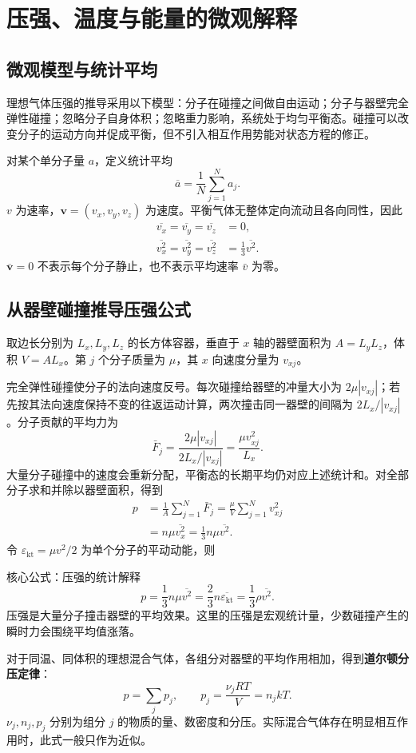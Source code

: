 \documentclass[UTF8,fontset=none,zihao=-4,a4paper]{ctexart}
\newcommand{\chapterpage}[1]{\clearpage\section{#1}}
\newcommand{\term}[1]{\textbf{#1}}
\begin{document}
\chapterpage{压强、温度与能量的微观解释}
\subsection{微观模型与统计平均}
理想气体压强的推导采用以下模型：分子在碰撞之间做自由运动；分子与器壁完全弹性碰撞；忽略分子自身体积；忽略重力影响，系统处于均匀平衡态。碰撞可以改变分子的运动方向并促成平衡，但不引入相互作用势能对状态方程的修正。

对某个单分子量 $a$，定义统计平均
\[
 \overline a=\frac1N\sum_{j=1}^{N}a_j.
\]
$v$ 为速率，$\symbf v=(v_x,v_y,v_z)$ 为速度。平衡气体无整体定向流动且各向同性，因此
\begin{align*}
 \overline{v_x}=\overline{v_y}=\overline{v_z}&=0,\\
 \overline{v_x^2}=\overline{v_y^2}=\overline{v_z^2}&=\frac13\overline{v^2}.
\end{align*}
$\overline{\symbf v}=0$ 不表示每个分子静止，也不表示平均速率 $\bar v$ 为零。

\subsection{从器壁碰撞推导压强公式}
取边长分别为 $L_x,L_y,L_z$ 的长方体容器，垂直于 $x$ 轴的器壁面积为 $A=L_yL_z$，体积 $V=AL_x$。第 $j$ 个分子质量为 $\mu$，其 $x$ 向速度分量为 $v_{xj}$。

完全弹性碰撞使分子的法向速度反号。每次碰撞给器壁的冲量大小为 $2\mu|v_{xj}|$；若先按其法向速度保持不变的往返运动计算，两次撞击同一器壁的间隔为 $2L_x/|v_{xj}|$。分子贡献的平均力为
\[
 \bar F_j=\frac{2\mu|v_{xj}|}{2L_x/|v_{xj}|}
 =\frac{\mu v_{xj}^2}{L_x}.
\]
大量分子碰撞中的速度会重新分配，平衡态的长期平均仍对应上述统计和。对全部分子求和并除以器壁面积，得到
\begin{align*}
 p&=\frac{1}{A}\sum_{j=1}^{N}\bar F_j
 =\frac{\mu}{V}\sum_{j=1}^{N}v_{xj}^2\\
 &=n\mu\overline{v_x^2}
 =\frac13n\mu\overline{v^2}.
\end{align*}
令 $\varepsilon_{\mathrm{kt}}=\mu v^2/2$ 为单个分子的平动动能，则
\begin{infobox}{核心公式：压强的统计解释}
\[
 p=\frac13n\mu\overline{v^2}
 =\frac23n\overline{\varepsilon_{\mathrm{kt}}}
 =\frac13\rho\overline{v^2}.
\]
压强是大量分子撞击器壁的平均效果。这里的压强是宏观统计量，少数碰撞产生的瞬时力会围绕平均值涨落。
\end{infobox}
对于同温、同体积的理想混合气体，各组分对器壁的平均作用相加，得到\term{道尔顿分压定律}：
\[
 p=\sum_jp_j,\qquad p_j=\frac{\nu_jRT}{V}=n_jkT.
\]
$\nu_j,n_j,p_j$ 分别为组分 $j$ 的物质的量、数密度和分压。实际混合气体存在明显相互作用时，此式一般只作为近似。
\end{document}
